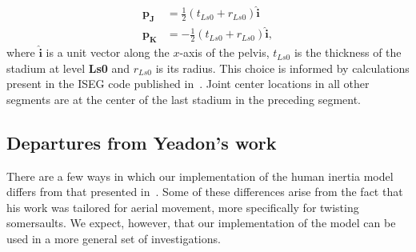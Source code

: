 \documentclass[10pt,a4paper,twocolumn]{article}
\begin{document}
\begin{align}
    \mathbf{p_J} &= \frac{1}{2} (t_{Ls0} + r_{Ls0})\hat{\mathbf{i}} \\
    \mathbf{p_K} &= -\frac{1}{2} (t_{Ls0} + r_{Ls0})\hat{\mathbf{i}},
\end{align}
where $\hat{\mathbf{i}}$ is a unit vector along the $x$-axis of the pelvis,
$t_{Ls0}$ is the thickness of the stadium at level \textbf{Ls0} and $r_{Ls0}$
is its radius. This choice is informed by calculations present in the ISEG code
published in~\cite{Yeadon1984a}. Joint center locations in all other segments
are at the center of the last stadium in the preceding segment.

\subsection*{Departures from Yeadon's work}

There are a few ways in which our implementation of the human inertia model
differs from that presented in~\cite{Yeadon1990c, Yeadon1990f, Yeadon1990e,
Yeadon1990d}. Some of these differences arise from the fact that his work was
tailored for aerial movement, more specifically for twisting somersaults. We
expect, however, that our implementation of the model can be used in a more
general set of investigations.
\end{document}
